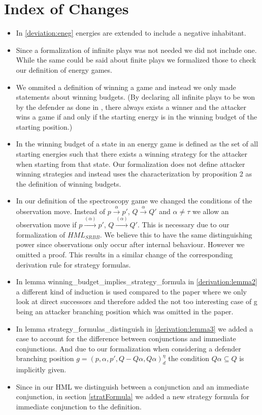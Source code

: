 \section{Index of Changes}
\begin{itemize}
    \item In \ref{deviation:eneg} energies are extended to include a negative inhabitant. 
    \item Since a formalization of infinite plays was not needed we did not include one. While the 
same could be said about finite plays we formalized those to check our definition of energy games.
    \item We ommited a definition of winning a game and instead we only made statements about winning budgets. 
(By declaring all infinite plays to be won by the defender as done in \cite{bisping2023lineartimebranchingtime}, 
there always exists a winner and the attacker wins a game if and only if the starting energy is in the winning budget of the starting position.)
    \item In \cite{bisping2023lineartimebranchingtime} the winning budget of a state in an energy game 
is defined as the set of all starting energies such that there exists a winning strategy for the attacker 
when starting from that state. Our formalization does not define attacker winning strategies and instead 
uses the characterization by proposition 2 \cite[p. 9]{bisping2023lineartimebranchingtime} as the definition of winning budgets.
    \item In our definition of the spectroscopy game we changed the conditions of the observation move. 
    Instead of $p \overset{\alpha}{\longrightarrow}p'$, $Q \overset{\alpha}{\longrightarrow} Q'$ and $\alpha \neq \tau$
    we allow an observation move if  $p \overset{(\alpha)}{\longrightarrow}p'$, $Q \overset{(\alpha)}{\longrightarrow} Q'$.
    This is necessary due to our formalization of $HML_{SRBB}$. We believe this to have the same distinguishing power 
    since observations only occur after internal behaviour. However we omitted a proof. 
    This results in a similar change of the corresponding derivation rule for strategy formulas.
    \item In lemma winning\_budget\_implies\_strategy\_formula in \ref{derivation:lemma2} a different kind of induction is used compared to the paper 
    where we only look at direct successors and therefore added the not too interesting case of g being an 
    attacker branching position which was omitted in the paper.
   \item In lemma strategy\_formulas\_distinguish in  \ref{derivation:lemma3} we added a case to account for the difference between 
conjunctions and immediate conjunctions. And due to our formalization when considering a
defender branching position $g=(p,\alpha ,p', Q - Q\alpha, Q\alpha)_d^\eta$ the condition 
$Q \alpha \subseteq Q$ is implicitly given.
  \item Since in our HML we distinguish between a conjunction and an immediate conjunction, in section \ref{stratFormula} 
we added a new strategy formula for immediate conjunction to the definition.
\end{itemize}
